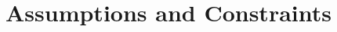 \documentclass[12pt]{article} %
\begin{document}
		
	
	
	
	
	
	
	
	

	

	
	\section{Assumptions and Constraints}
	
\end{document}
